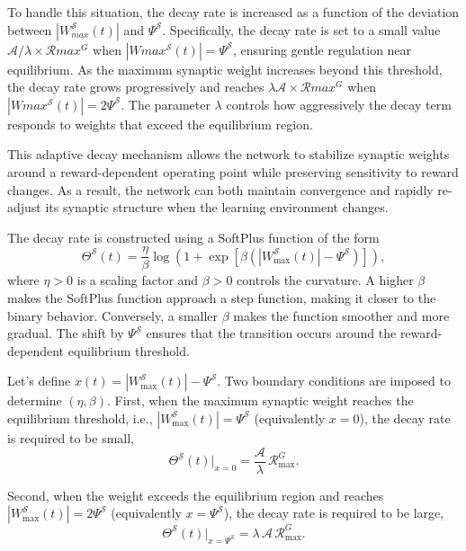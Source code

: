 To handle this situation, the decay rate is increased as a function of the deviation between $|W_{max}^{\mathcal{S}}(t)|$ and $\Psi^{\mathcal{S}}$. Specifically, the decay rate is set to a small value $\mathcal{A}/\lambda \times \mathcal{R}{max}^{G}$ when $|W{max}^{\mathcal{S}}(t)| = \Psi^{\mathcal{S}}$, ensuring gentle regulation near equilibrium. As the maximum synaptic weight increases beyond this threshold, the decay rate grows progressively and reaches $\lambda \mathcal{A} \times \mathcal{R}{max}^{G}$ when $|W{max}^{\mathcal{S}}(t)| = 2\Psi^{\mathcal{S}}$. The parameter $\lambda$ controls how aggressively the decay term responds to weights that exceed the equilibrium region.

This adaptive decay mechanism allows the network to stabilize synaptic weights around a reward-dependent operating point while preserving sensitivity to reward changes. As a result, the network can both maintain convergence and rapidly re-adjust its synaptic structure when the learning environment changes.

The decay rate is constructed using a SoftPlus function of the form
\begin{equation} \label{Eq.WS.Deriv.1}
\Theta^{\mathcal{S}}(t)
=
\frac{\eta}{\beta}
\log\!\left(1+\exp\!\left[\beta\left(|W^{\mathcal{S}}_{\max}(t)|-\Psi^{\mathcal{S}}\right)\right]\right),
\end{equation}
where $\eta>0$ is a scaling factor and $\beta>0$ controls the curvature. A higher \(\beta\) makes the SoftPlus function approach a step function, making it closer to the binary behavior. Conversely, a smaller \(\beta\) makes the function smoother and more gradual. The shift by $\Psi^{\mathcal{S}}$ ensures that the transition occurs around the reward-dependent equilibrium threshold.

Let's define \(x(t)=|W^{\mathcal{S}}_{\max}(t)|-\Psi^{\mathcal{S}}\). Two boundary conditions are imposed to determine $(\eta,\beta)$.
First, when the maximum synaptic weight reaches the equilibrium threshold, i.e., $|W^{\mathcal{S}}_{\max}(t)|=\Psi^{\mathcal{S}}$ (equivalently $x=0$), the decay rate is required to be small,
\begin{equation} \label{Eq.WS.Deriv.3}
\Theta^{\mathcal{S}}(t)\Big|_{x=0}
=
\frac{\mathcal{A}}{\lambda}\,\mathcal{R}^{G}_{\max}.
\end{equation}

Second, when the weight exceeds the equilibrium region and reaches $|W^{\mathcal{S}}_{\max}(t)|=2\Psi^{\mathcal{S}}$ (equivalently $x=\Psi^{\mathcal{S}}$), the decay rate is required to be large,
\begin{equation} \label{Eq.WS.Deriv.4}
\Theta^{\mathcal{S}}(t)\Big|_{x=\Psi^{\mathcal{S}}}
=
\lambda\,\mathcal{A}\,\mathcal{R}^{G}_{\max}.
\end{equation}

